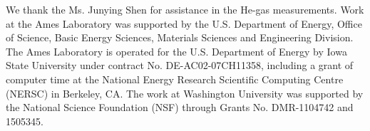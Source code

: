 \documentclass[aps,prb,preprint,groupedaddress,showpacs,amsmath,amssymb]{revtex4}
\begin{document}
\begin{acknowledgments}

We thank the  Ms. Junying Shen for assistance in the He-gas measurements. Work at the Ames Laboratory was supported by the U.S. Department of Energy, Office of Science, Basic Energy Sciences, Materials Sciences and Engineering Division. The Ames Laboratory is operated for the U.S. Department of Energy by Iowa State University under contract No. DE-AC02-07CH11358, including a grant of computer time at the National Energy Research Scientific Computing Centre (NERSC) in Berkeley, CA. The work at Washington University was supported by the National Science Foundation (NSF) through Grants No. DMR-1104742 and 1505345.

\end{acknowledgments}
\end{document}
